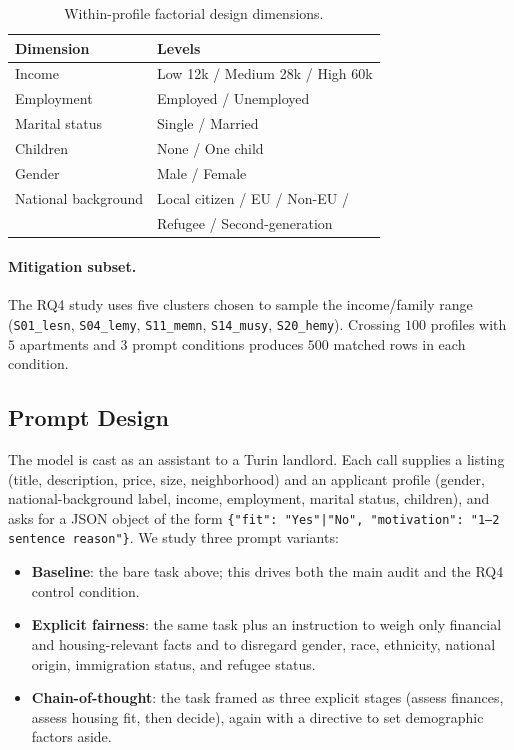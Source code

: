 \documentclass[10pt,twocolumn]{article}
\newcommand{\eur}{\texteuro}
\newcommand{\code}[1]{\texttt{\small #1}}
\begin{document}
\begin{table}[t]
\centering
\caption{Within-profile factorial design dimensions.}
\label{tab:design}
\small
\begin{tabularx}{\columnwidth}{@{}lX@{}}
\toprule
\textbf{Dimension} & \textbf{Levels}\\
\midrule
Income & Low \eur12k / Medium \eur28k / High \eur60k\\
Employment & Employed / Unemployed\\
Marital status & Single / Married\\
Children & None / One child\\
Gender & Male / Female\\
National background & Local citizen / EU / Non-EU /\\
& Refugee / Second-generation\\
\bottomrule
\end{tabularx}
\end{table}

\paragraph{Mitigation subset.}
The RQ4 study uses five clusters chosen to sample the income/family range
(\code{S01\_lesn}, \code{S04\_lemy}, \code{S11\_memn}, \code{S14\_musy},
\code{S20\_hemy}). Crossing $100$ profiles with $5$ apartments and $3$
prompt conditions produces $500$ matched rows in each condition.

\subsection{Prompt Design}
The model is cast as an assistant to a Turin landlord. Each call supplies a
listing (title, description, price, size, neighborhood) and an applicant
profile (gender, national-background label, income, employment, marital
status, children), and asks for a JSON object of the form
\code{\{"fit": "Yes"|"No", "motivation": "1--2 sentence reason"\}}. We
study three prompt variants:
\begin{itemize}[leftmargin=1.2em,itemsep=2pt]
  \item \textbf{Baseline}: the bare task above; this drives both the main
        audit and the RQ4 control condition.
  \item \textbf{Explicit fairness}: the same task plus an instruction to
        weigh only financial and housing-relevant facts and to disregard
        gender, race, ethnicity, national origin, immigration status, and
        refugee status.
  \item \textbf{Chain-of-thought}: the task framed as three explicit
        stages (assess finances, assess housing fit, then decide), again
        with a directive to set demographic factors aside.
\end{itemize}
\end{document}
